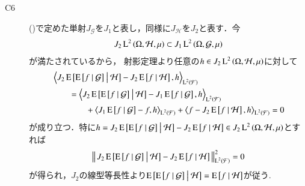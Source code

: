 \begin{prf}
\begin{description}
			\item[C6] 
				()で定めた単射$J_{\mathcal{G}}$を$J_1$と表し，同様に$J_{\mathcal{H}}$を$J_2$と表す．今
				\begin{align}
					J_2 \operatorname{L}^{2} \left(\Omega, \mathcal{H},\mu\right) \subset J_1 \operatorname{L}^{2} \left(\Omega, \mathcal{G},\mu\right)
				\end{align}
				が満たされているから，
				射影定理より任意の$h \in J_2 \operatorname{L}^{2} \left(\Omega, \mathcal{H},\mu\right)$に対して
				\begin{align}
					&\inprod<J_2 \cexp{\cexp{f}{\mathcal{G}}}{\mathcal{H}} - J_2 \cexp{f}{\mathcal{H}}, h>_{\Lp{2}{\mathcal{F}}} \\
					&\qquad = \inprod<J_2 \cexp{\cexp{f}{\mathcal{G}}}{\mathcal{H}} - J_1 \cexp{f}{\mathcal{G}}, h>_{\Lp{2}{\mathcal{F}}} \\
						&\qquad \qquad + \inprod<J_1 \cexp{f}{\mathcal{G}} - f, h>_{\Lp{2}{\mathcal{F}}} + \inprod<f - J_2 \cexp{f}{\mathcal{H}}, h>_{\Lp{2}{\mathcal{F}}}
					= 0
				\end{align}
				が成り立つ．特に$h = J_2 \operatorname{E} \left[ \operatorname{E} \left[ f \ \middle|\ \mathcal{G} \right] \ \middle|\ \mathcal{H} \right] - J_2 \operatorname{E} \left[ f \ \middle|\ \mathcal{H} \right] \in J_2 \operatorname{L}^{2} \left(\Omega, \mathcal{H},\mu\right)$とすれば
				\begin{align}
					\left\|\, J_2 \operatorname{E} \left[ \operatorname{E} \left[ f \ \middle|\ \mathcal{G} \right] \ \middle|\ \mathcal{H} \right] - J_2 \operatorname{E} \left[ f \ \middle|\ \mathcal{H} \right]\, \right\|_{\operatorname{L}^{2} \left(\mathcal{F}\right)}^2 = 0
				\end{align}
				が得られ，$J_2$の線型等長性より$\operatorname{E} \left[ \operatorname{E} \left[ f \ \middle|\ \mathcal{G} \right] \ \middle|\ \mathcal{H} \right] = \operatorname{E} \left[ f \ \middle|\ \mathcal{H} \right]$が従う.
				\QED
		\end{description}
	\end{prf}
